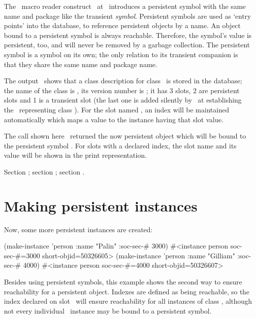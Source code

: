 The \cl\ macro reader construct
\ at \oi\ introduces a
persistent symbol with the same name and package like the transient
\emph{\lt{}symbol\gt}. Persistent symbols are used as `entry points'
into the database, to reference persistent objects by a name. An
object bound to a persistent symbol is always reachable. Therefore,
the symbol's value is persistent, too, and will never be removed by a
garbage collection. The persistent symbol is a symbol on its own; the
only relation to its transient companion is that they share the same
name and package name.

The output \oii\ shows that a class description for class
\ is stored in the database; the name of the class is
, its version number is ; it has 3 slots, 2
are persistent slots and 1 is a transient slot (the last one is added
silently by \plob\ at establishing the \clsmo\ representing class
). For the slot named , an index will
be maintained automatically which maps a value to the instance having
that slot value.

The call shown here \oiii\ returned the now persistent object which
will be bound to the persistent symbol . For slots with
a declared index, the slot name and its value will be shown in the
print representation.

 Section ;
section ;
section .

\section{Making persistent instances}

Now, some more persistent instances are created:
\begin{CompactCode}
\listener{}(make-instance 'person :name "Palin" :soc-sec-# 3000)
#<instance person soc-sec-#=3000 short-objid=50326605>
\listener{}(make-instance 'person :name "Gilliam" :soc-sec-# 4000)
#<instance person soc-sec-#=4000 short-objid=50326607>
\end{CompactCode}

Besides using persistent symbols, this example shows the second way to
ensure reachability for a persistent object. Indexes are defined as
being reachable, so the index declared on slot \ will
ensure reachability for all instances of class ,
although not every individual \ instance may be bound to
a persistent symbol.

